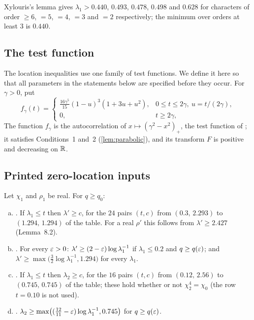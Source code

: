 Xylouris's lemma gives $\lambda_1>0.440$, $0.493$, $0.478$, $0.498$ and $0.628$ for characters of order
$\ge6$, $=5$, $=4$, $=3$ and $=2$ respectively; the minimum over orders at least $3$ is $0.440$.

\subsection{The test function}
The location inequalities use one family of test functions. We define it here so that
all parameters in the statements below are specified before they occur.
For $\gamma>0$, put
\begin{equation}\label{eq:ftest}
  f_\gamma(t)=\begin{cases}\frac{16\gamma^5}{15}(1-u)^3(1+3u+u^2),&0\le t\le2\gamma,\ u=t/(2\gamma),\\
  0,&t\ge2\gamma,\end{cases}
\end{equation}
The function $f_\gamma$ is the autocorrelation of $x\mapsto(\gamma^2-x^2)_+$, the test function of
\cite[(3.14), (3.17)--(3.18)]{Xylouris2011nullstellen}; it satisfies Conditions~1 and~2
(\cref{lem:parabolic}), and its transform $F$ is positive and decreasing on $\mathbb{R}$.

\subsection{Printed zero-location inputs}

\begin{inp}\label{inp:rrtables}
Let $\chi_1$ and $\rho_1$ be real. For $q\ge q_0$:
\begin{enumerate}[(a)]
  \item \cite[Tables~3 and~4, Lemmas~8.2 and~8.3]{HeathBrown1992zero}. If $\lambda_1\le t$ then
    $\lambda'\ge c$, for the $24$ pairs $(t,c)$ from $(0.3,\,2.293)$ to $(1.294,\,1.294)$ of the table.
    For a real $\rho'$ this follows from $\lambda'\ge2.427$ (Lemma~8.2).
  \item \cite[Lemma~8.4]{HeathBrown1992zero}. For every $\varepsilon>0$: $\lambda'\ge(2-\varepsilon)\log\lambda_1^{-1}$ if
    $\lambda_1\le0.2$ and $q\ge q(\varepsilon)$; and $\lambda'\ge\max\bigl(\frac32\log\lambda_1^{-1},1.294\bigr)$ for every $\lambda_1$.
  \item \cite[Table~7 and Lemma~8.7]{HeathBrown1992zero}. If $\lambda_1\le t$ then $\lambda_2\ge c$, for
    the $16$ pairs $(t,c)$ from $(0.12,\,2.56)$ to $(0.745,\,0.745)$ of the table; these hold whether or
    not $\chi_2^4=\chi_0$ (the row $t=0.10$ is not used).
  \item \cite[Lemma~8.8]{HeathBrown1992zero}. $\lambda_2\ge\max\bigl((\frac{12}{11}-\varepsilon)\log\lambda_1^{-1},0.745\bigr)$
    for $q\ge q(\varepsilon)$.
\end{enumerate}
\end{inp}

